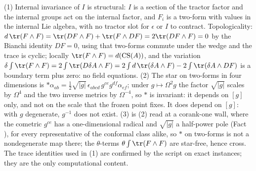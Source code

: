 (1) Internal invariance of $I$ is structural: $I$ is a section of the tractor factor and the internal groups act on the internal factor, and $F_i$ is a two-form with values in the internal Lie algebra, with no tractor slot for $\epsilon$ or $I$ to contract. Topologicality: $d\,\tr(F\wedge F) = \tr(DF\wedge F) + \tr(F\wedge DF) = 2\tr(DF\wedge F) = 0$ by the Bianchi identity $DF = 0$, using that two-forms commute under the wedge and the trace is cyclic; locally $\tr(F\wedge F) = d(\mathrm{CS}(A))$, and the variation $\delta\int\tr(F\wedge F) = 2\int\tr(D\delta A\wedge F) = 2\int d\,\tr(\delta A\wedge F) - 2\int\tr(\delta A\wedge DF)$ is a boundary term plus zero: no field equations. (2) The star on two-forms in four dimensions is $*\alpha_{ab} = \tfrac12\sqrt{|g|}\,\epsilon_{abcd}\,g^{ce}g^{df}\alpha_{ef}$; under $g \mapsto \Omega^2 g$ the factor $\sqrt{|g|}$ scales by $\Omega^4$ and the two inverse metrics by $\Omega^{-4}$, so $*$ is invariant: it depends on $[g]$ only, and not on the scale that the frozen point fixes. It does depend on $[g]$: with $g$ degenerate, $g^{-1}$ does not exist. (3) is (2) read at a corank-one wall, where the cometric $g^{ce}$ has a one-dimensional radical and $\sqrt{|g|}$ a half-power pole (Fact ), for every representative of the conformal class alike, so $*$ on two-forms is not a nondegenerate map there; the $\theta$-terms $\theta\int\tr(F\wedge F)$ are star-free, hence cross. The trace identities used in (1) are confirmed by the script on exact instances; they are the only computational content.
